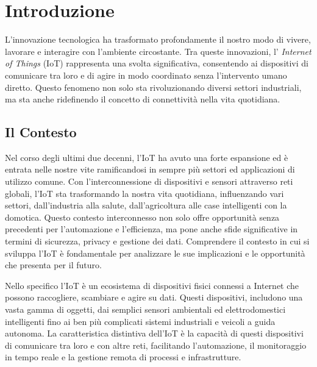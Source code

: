\chapter{Introduzione}

L'innovazione tecnologica ha trasformato profondamente il nostro modo di vivere, lavorare e interagire con l'ambiente circostante. Tra queste innovazioni, l' \textit{Internet of Things} (IoT) rappresenta una svolta significativa, consentendo ai dispositivi di comunicare tra loro e di agire in modo coordinato senza l'intervento umano diretto. Questo fenomeno non solo sta rivoluzionando diversi settori industriali, ma sta anche ridefinendo il concetto di connettività nella vita quotidiana.

\section{Il Contesto}

Nel corso degli ultimi due decenni, l'IoT ha avuto una forte espansione ed è entrata nelle nostre vite ramificandosi in sempre più settori ed applicazioni di utilizzo comune. Con l'interconnessione di dispositivi e sensori attraverso reti globali, l'IoT sta trasformando la nostra vita quotidiana, influenzando vari settori, dall'industria alla salute, dall'agricoltura alle case intelligenti con la domotica. Questo contesto interconnesso non solo offre opportunità senza precedenti per l'automazione e l'efficienza, ma pone anche sfide significative in termini di sicurezza, privacy e gestione dei dati. Comprendere il contesto in cui si sviluppa l'IoT è fondamentale per analizzare le sue implicazioni e le opportunità che presenta per il futuro.

Nello specifico l'IoT è un ecosistema di dispositivi fisici connessi a Internet che possono raccogliere, scambiare e agire su dati. Questi dispositivi, includono una vasta gamma di oggetti, dai semplici sensori ambientali ed elettrodomestici intelligenti fino ai ben più complicati sistemi industriali e veicoli a guida autonoma. La caratteristica distintiva dell'IoT è la capacità di questi dispositivi di comunicare tra loro e con altre reti, facilitando l'automazione, il monitoraggio in tempo reale e la gestione remota di processi e infrastrutture.

